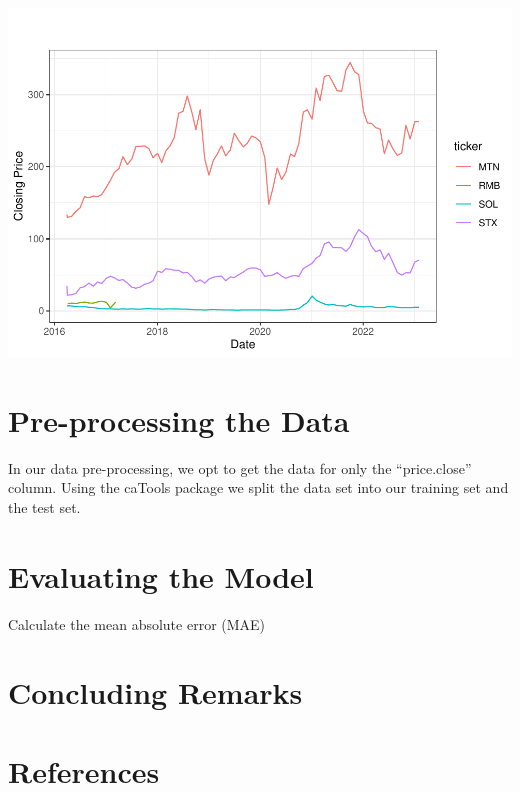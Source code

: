 \documentclass[
]{article}
\begin{document}
\includegraphics{JSE_Stocks_files/figure-latex/prices_plot-1.pdf}

\hypertarget{pre-processing-the-data}{%
\section{Pre-processing the Data}\label{pre-processing-the-data}}

In our data pre-processing, we opt to get the data for only the
``price.close'' column. Using the caTools package we split the data set
into our training set and the test set.

\hypertarget{evaluating-the-model}{%
\section{Evaluating the Model}\label{evaluating-the-model}}

Calculate the mean absolute error (MAE)

\hypertarget{concluding-remarks}{%
\section{Concluding Remarks}\label{concluding-remarks}}

\hypertarget{references}{%
\section{References}\label{references}}


\end{document}
